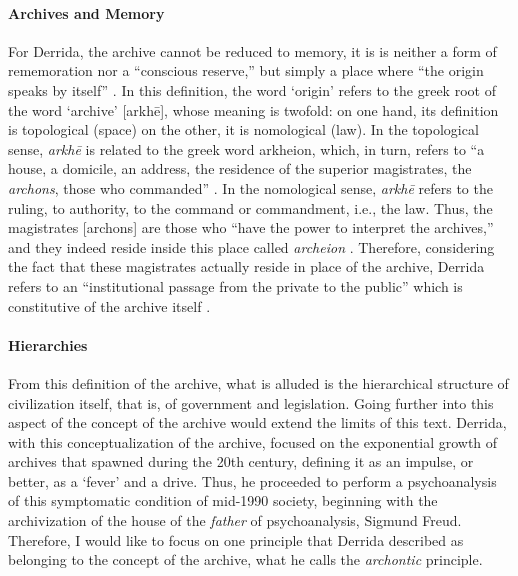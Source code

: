 
\paragraph{Archives and Memory}
For Derrida, the archive cannot be reduced to memory, it is is neither a form of rememoration nor a ``conscious reserve,'' but simply a place where ``the origin speaks by itself'' \parencite[60]{Der95:Arc}. In this definition, the word `origin' refers to the greek root of the word `archive' [arkhē], whose meaning is twofold: on one hand, its definition is topological (space) on the other, it is nomological (law). In the topological sense, \textit{arkhē} is related to the greek word arkheion, which, in turn, refers to ``a house, a domicile, an address, the residence of the superior magistrates, the \textit{archons}, those who commanded'' \parencite[9]{Der95:Arc}. In the nomological sense, \textit{arkhē} refers to the ruling, to authority, to the command or commandment, i.e., the law. Thus, the magistrates [archons] are those who ``have the power to interpret the archives,'' and they indeed reside inside this place called \textit{archeion} \parencite[9]{Der95:Arc}. Therefore, considering the fact that these magistrates actually reside in place of the archive, Derrida refers to an ``institutional passage from the private to the public'' which is constitutive of the archive itself \parencite[9]{Der95:Arc}.

\paragraph{Hierarchies}
From this definition of the archive, what is alluded is the hierarchical structure of civilization itself, that is, of government and legislation. Going further into this aspect of the concept of the archive would extend the limits of this text. Derrida, with this conceptualization of the archive, focused on the exponential growth of archives that spawned during the 20th century, defining it as an impulse, or better, as a `fever' and a drive. Thus, he proceeded to perform a psychoanalysis of this symptomatic condition of mid-1990 society, beginning with the archivization of the house of the \textit{father} of psychoanalysis, Sigmund Freud. Therefore, I would like to focus on one principle that Derrida described as belonging to the concept of the archive, what he calls the \textit{archontic} principle. 

